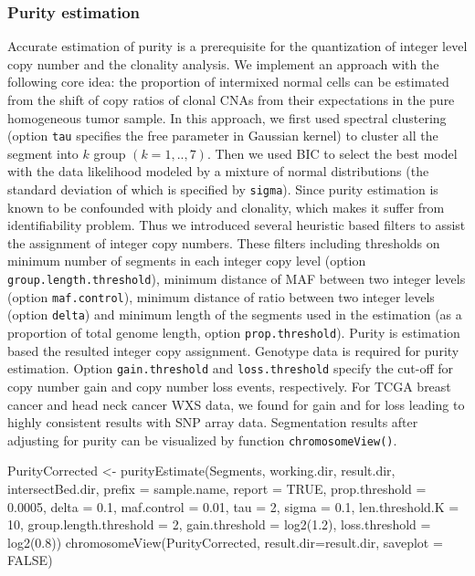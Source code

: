 \documentclass{article}
\newcommand{\code}[1]{\texttt{#1}}
\begin{document}
\subsubsection{Purity estimation}

Accurate estimation of purity is a prerequisite for the quantization of integer level copy number and the clonality analysis. We implement an approach with the following core idea: the proportion of intermixed normal cells can be estimated from the shift of copy ratios of clonal CNAs from their expectations in the pure homogeneous tumor sample. In this approach, we first used spectral clustering (option \code{tau} specifies the free parameter in Gaussian kernel) to cluster all the segment into $k$ group $(k = 1, .., 7)$. Then we used BIC to select the best model with the data likelihood modeled by a mixture of normal distributions (the standard deviation of which is specified by \code{sigma}). Since purity estimation is known to be confounded with ploidy and clonality, which makes it suffer from identifiability problem. Thus we introduced several heuristic based filters to assist the assignment of integer copy numbers. These filters including thresholds on minimum number of segments in each integer copy level (option \code{group.length.threshold}), minimum distance of MAF between two integer levels (option \code{maf.control}), minimum distance of ratio between two integer levels (option \code{delta}) and minimum length of the segments used in the estimation (as a proportion of total genome length, option \code{prop.threshold}). Purity is estimation based the resulted integer copy assignment. Genotype data is required for purity estimation. Option \code{gain.threshold} and \code{loss.threshold} specify the cut-off for copy number gain and copy number loss events, respectively. For TCGA breast cancer and head neck cancer WXS data, we found for gain and for loss leading to highly consistent results with SNP array data. Segmentation results after adjusting for purity can be visualized by function \code{chromosomeView()}.

\begin{Schunk}
\begin{Sinput}
 PurityCorrected <- purityEstimate(Segments, working.dir,
     result.dir, intersectBed.dir,
     prefix = sample.name, report = TRUE,
     prop.threshold = 0.0005, delta = 0.1,
     maf.control = 0.01, tau = 2,
     sigma = 0.1, len.threshold.K = 10,
     group.length.threshold = 2, gain.threshold = log2(1.2),
     loss.threshold = log2(0.8))
 chromosomeView(PurityCorrected, result.dir=result.dir,
                saveplot = FALSE)
\end{Sinput}
\end{Schunk}
\end{document}
